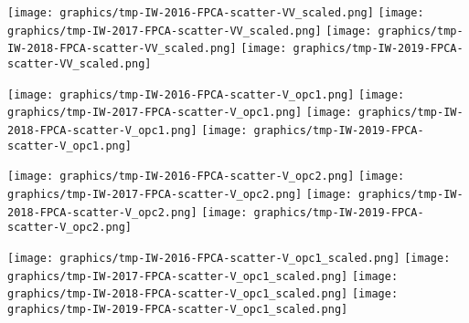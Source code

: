 \clearpage
\begin{center}
\begin{minipage}{7.0in}
\texttt{[image: graphics/tmp-IW-2016-FPCA-scatter-VV\_scaled.png]}
\quad
\texttt{[image: graphics/tmp-IW-2017-FPCA-scatter-VV\_scaled.png]}
\vskip 1.0cm
\texttt{[image: graphics/tmp-IW-2018-FPCA-scatter-VV\_scaled.png]}
\quad
\texttt{[image: graphics/tmp-IW-2019-FPCA-scatter-VV\_scaled.png]}
\end{minipage}
\end{center}


\clearpage
\begin{center}
\begin{minipage}{7.0in}
\texttt{[image: graphics/tmp-IW-2016-FPCA-scatter-V\_opc1.png]}
\quad
\texttt{[image: graphics/tmp-IW-2017-FPCA-scatter-V\_opc1.png]}
\vskip 1.0cm
\texttt{[image: graphics/tmp-IW-2018-FPCA-scatter-V\_opc1.png]}
\quad
\texttt{[image: graphics/tmp-IW-2019-FPCA-scatter-V\_opc1.png]}
\end{minipage}
\end{center}


\clearpage
\begin{center}
\begin{minipage}{7.0in}
\texttt{[image: graphics/tmp-IW-2016-FPCA-scatter-V\_opc2.png]}
\quad
\texttt{[image: graphics/tmp-IW-2017-FPCA-scatter-V\_opc2.png]}
\vskip 1.0cm
\texttt{[image: graphics/tmp-IW-2018-FPCA-scatter-V\_opc2.png]}
\quad
\texttt{[image: graphics/tmp-IW-2019-FPCA-scatter-V\_opc2.png]}
\end{minipage}
\end{center}


\clearpage
\begin{center}
\begin{minipage}{7.0in}
\texttt{[image: graphics/tmp-IW-2016-FPCA-scatter-V\_opc1\_scaled.png]}
\quad
\texttt{[image: graphics/tmp-IW-2017-FPCA-scatter-V\_opc1\_scaled.png]}
\vskip 1.0cm
\texttt{[image: graphics/tmp-IW-2018-FPCA-scatter-V\_opc1\_scaled.png]}
\quad
\texttt{[image: graphics/tmp-IW-2019-FPCA-scatter-V\_opc1\_scaled.png]}
\end{minipage}
\end{center}

